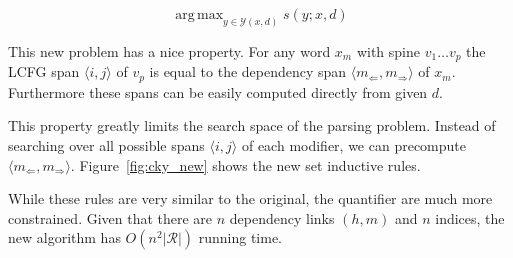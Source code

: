 \documentclass[11pt,letterpaper]{article}
\DeclareMathOperator*{\argmax}{arg\,max}
\newcommand{\rules}{\mathcal{R}}
\newcommand{\Left}[1]{#1_{\Leftarrow}}
\newcommand{\Right}[1]{#1_{\Rightarrow}}
\newcommand{\Span}[1]{\langle #1 \rangle}
\begin{document}
\[ \argmax_{y \in \mathcal{Y}(x, d)} s(y; x, d)\]

This new problem has a nice property. For any word $x_m$ with spine $v_1 \ldots v_p$ the LCFG span  $\Span{i,j}$ of $v_p$ is equal to the dependency span $\langle \Left{m},\Right{m}\rangle$ of $x_m$. Furthermore these spans can be easily computed directly from given $d$.

This property greatly limits the search space of the parsing problem.
Instead of searching over all possible spans $\Span{i, j}$ of each modifier, we can
precompute $\langle \Left{m},\Right{m}\rangle$. Figure~\ref{fig:cky_new} shows the new set inductive rules.

While these rules are very similar to the original, the quantifier are
much more constrained. Given that there are $n$ dependency links $(h, m)$ and $n$ indices, the new algorithm has $O(n^2|\rules|)$ running time.







%

\end{document}

